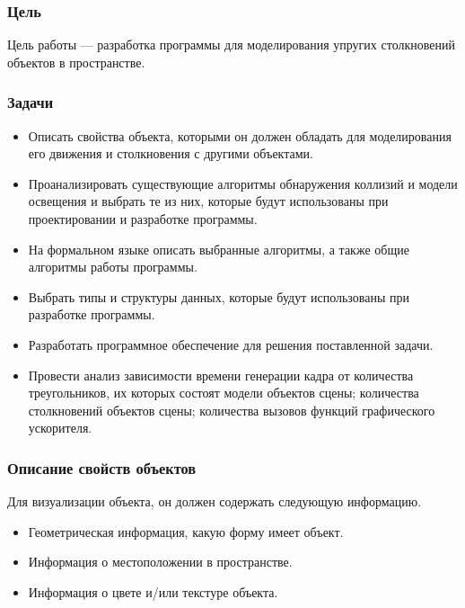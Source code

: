 \documentclass{beamer}
\begin{document}
\begin{frame}
\frametitle{Цель}

Цель работы --- разработка программы для моделирования упругих столкновений объектов в пространстве.

\end{frame}
\begin{frame}
\frametitle{Задачи}
\begin{itemize}
    \item<1-> Описать свойства объекта, которыми он должен обладать для моделирования его движения и столкновения с другими объектами.
    \item<2-> Проанализировать существующие алгоритмы обнаружения коллизий и модели освещения и выбрать те из них, которые будут использованы при проектировании и разработке программы.
    \item<3-> На формальном языке описать выбранные алгоритмы, а также общие алгоритмы работы программы.
    \item<4-> Выбрать типы и структуры данных, которые будут использованы при разработке программы.
    \item<5-> Разработать программное обеспечение для решения поставленной задачи.
    \item<6-> Провести анализ зависимости времени генерации кадра от количества треугольников, их которых состоят модели объектов сцены; количества столкновений объектов сцены; количества вызовов функций графического ускорителя.
\end{itemize}
\end{frame}

\begin{frame}
\frametitle{Описание свойств объектов}
Для визуализации объекта, он должен содержать следующую информацию.
\begin{itemize}
    \item<1-> Геометрическая информация, какую форму имеет объект.
    \item<2-> Информация о местоположении в пространстве.
    \item<3-> Информация о цвете и/или текстуре объекта.
\end{itemize}
\end{frame}
\end{document}
